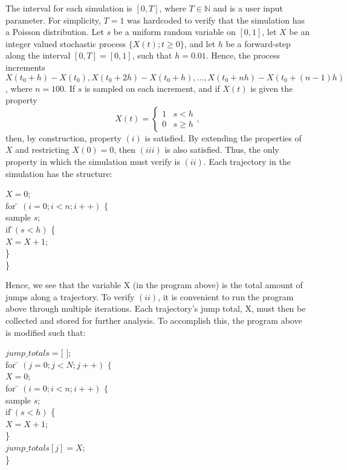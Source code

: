 \documentclass{article}
\begin{document}
The interval for each simulation is $[0,T]$, where $T\in \mathbb{N}$ and is a user input parameter. For simplicity, $T = 1$ was hardcoded to verify that the simulation has a Poisson distribution.\newline
\indent Let $s$ be a uniform random variable on $[0,1]$, let $X$ be an integer valued stochastic process $\{X(t); t\geq0\}$, and let $h$ be a forward-step along the interval $[0,T] = [0,1]$, such that $h = 0.01$. Hence, the process increments \newline $X(t_{0} + h) - X(t_{0}), X(t_{0} + 2h) - X(t_{0} + h), \ldots,X(t_{0} + nh) - X(t_{0} + (n-1)h)  $, where $n=100$. If $s$ is sampled on each increment, and if $X(t)$ is given the property
\[ X(t) = \begin{cases} 
      1 & s < h \\
      0 & s\geq h 
   \end{cases}
,\]
 then, by construction, property $(i)$ is satisfied. By extending the properties of $X$ and restricting $X(0) = 0$, then $(iii)$ is also satisfied. Thus, the only property in which the simulation must verify is $(ii)$.\newpage
\indent Each trajectory in the simulation has the structure:
\begin{tabbing}
$X = 0$; \\
for \= $(i = 0; i < n; i++)$ $ \{$\\
\> sample $s$;\\
\> if \=$(s < h)$ \{ \\ 
\> \> $X = X + 1$; \\
\>  \} \\
\} 
\end{tabbing}

\noindent Hence, we see that the variable X (in the program above) is the total amount of jumps along a trajectory. To verify $(ii)$, it is convenient to run the program above through multiple iterations. Each trajectory's jump total, X, must then be collected and stored for further analysis. To accomplish this, the program above is modified such that:
\begin{tabbing}
$jump\_totals = [$ $]$; \\
for \= $(j = 0; j < N; j++)$ $ \{$\\
\> $X = 0$; \\
\> for \= $(i = 0; i < n; i++)$ $ \{$\\
\> \> sample $s$;\\
\> \> if \=$(s < h)$ \{ \\ 
\> \> \> $X = X + 1$; \\
\>  \> \} \\
\> $jump\_totals[j] = X$;\\
\}
\end{tabbing}
\end{document}
